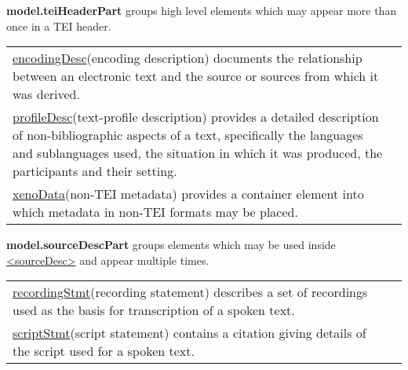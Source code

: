 \begin{sansreflist}
\item [\textbf{model.teiHeaderPart}] groups high level elements which may appear more than once in a TEI header. \par 
\begin{longtable}{P{0.16940035273368606\textwidth}P{0.6805996472663138\textwidth}}
\hyperref[TEI.encodingDesc]{encodingDesc}\tabcellsep (encoding description) documents the relationship between an electronic text and the source or sources from which it was derived.\\
\hyperref[TEI.profileDesc]{profileDesc}\tabcellsep (text-profile description) provides a detailed description of non-bibliographic aspects of a text, specifically the languages and sublanguages used, the situation in which it was produced, the participants and their setting.\\
\hyperref[TEI.xenoData]{xenoData}\tabcellsep (non-TEI metadata) provides a container element into which metadata in non-TEI formats may be placed.\end{longtable} \par
 
\item [\textbf{model.sourceDescPart}] groups elements which may be used inside \hyperref[TEI.sourceDesc]{<sourceDesc>} and appear multiple times. \par 
\begin{longtable}{P{0.2463768115942029\textwidth}P{0.6036231884057971\textwidth}}
\hyperref[TEI.recordingStmt]{recordingStmt}\tabcellsep (recording statement) describes a set of recordings used as the basis for transcription of a spoken text.\\
\hyperref[TEI.scriptStmt]{scriptStmt}\tabcellsep (script statement) contains a citation giving details of the script used for a spoken text.\end{longtable} \par
 

\end{sansreflist}
